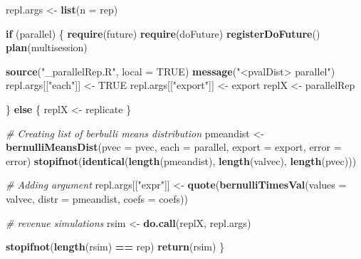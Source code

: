\documentclass[]{article}
\newenvironment{Shaded}{\begin{snugshade}}{\end{snugshade}}
\newcommand{\CommentTok}[1]{\textcolor[rgb]{0.56,0.35,0.01}{\textit{#1}}}
\newcommand{\ControlFlowTok}[1]{\textcolor[rgb]{0.13,0.29,0.53}{\textbf{#1}}}
\newcommand{\DataTypeTok}[1]{\textcolor[rgb]{0.13,0.29,0.53}{#1}}
\newcommand{\KeywordTok}[1]{\textcolor[rgb]{0.13,0.29,0.53}{\textbf{#1}}}
\newcommand{\NormalTok}[1]{#1}
\newcommand{\OperatorTok}[1]{\textcolor[rgb]{0.81,0.36,0.00}{\textbf{#1}}}
\newcommand{\OtherTok}[1]{\textcolor[rgb]{0.56,0.35,0.01}{#1}}
\newcommand{\StringTok}[1]{\textcolor[rgb]{0.31,0.60,0.02}{#1}}
\begin{document}
\begin{Shaded}
\begin{Highlighting}[]
\NormalTok{        repl.args <-}\StringTok{ }\KeywordTok{list}\NormalTok{(}\DataTypeTok{n =}\NormalTok{ rep)}
        
        \ControlFlowTok{if}\NormalTok{ (parallel) \{}
                \KeywordTok{require}\NormalTok{(future)}
                \KeywordTok{require}\NormalTok{(doFuture)}
                \KeywordTok{registerDoFuture}\NormalTok{()}
                \KeywordTok{plan}\NormalTok{(multisession)}
                
                \KeywordTok{source}\NormalTok{(}\StringTok{"_parallelRep.R"}\NormalTok{, }\DataTypeTok{local =} \OtherTok{TRUE}\NormalTok{)}
                \KeywordTok{message}\NormalTok{(}\StringTok{"<pvalDist> parallel"}\NormalTok{)}
\NormalTok{                repl.args[[}\StringTok{"each"}\NormalTok{]] <-}\StringTok{ }\OtherTok{TRUE}
\NormalTok{                repl.args[[}\StringTok{"export"}\NormalTok{]] <-}\StringTok{ }\NormalTok{export}
\NormalTok{                replX <-}\StringTok{ }\NormalTok{parallelRep}
                
\NormalTok{        \} }\ControlFlowTok{else}\NormalTok{ \{}
\NormalTok{                replX <-}\StringTok{ }\NormalTok{replicate}
\NormalTok{        \}}
        
        \CommentTok{# Creating list of berbulli means distribution}
\NormalTok{        pmeandist <-}\StringTok{ }\KeywordTok{bernulliMeansDist}\NormalTok{(}\DataTypeTok{pvec =}\NormalTok{ pvec, }\DataTypeTok{each =}\NormalTok{ parallel,}
                                       \DataTypeTok{export =}\NormalTok{ export, }\DataTypeTok{error =}\NormalTok{ error)}
        \KeywordTok{stopifnot}\NormalTok{(}\KeywordTok{identical}\NormalTok{(}\KeywordTok{length}\NormalTok{(pmeandist), }\KeywordTok{length}\NormalTok{(valvec), }\KeywordTok{length}\NormalTok{(pvec)))}
        
        \CommentTok{# Adding argument}
\NormalTok{        repl.args[[}\StringTok{"expr"}\NormalTok{]] <-}\StringTok{ }\KeywordTok{quote}\NormalTok{(}\KeywordTok{bernulliTimesVal}\NormalTok{(}\DataTypeTok{values =}\NormalTok{ valvec,}
                                                      \DataTypeTok{distr =}\NormalTok{ pmeandist,}
                                                      \DataTypeTok{coefs =}\NormalTok{ coefs))}
        
        \CommentTok{# revenue simulations}
\NormalTok{        rsim <-}\StringTok{ }\KeywordTok{do.call}\NormalTok{(replX, repl.args)}
        
        \KeywordTok{stopifnot}\NormalTok{(}\KeywordTok{length}\NormalTok{(rsim) }\OperatorTok{==}\StringTok{ }\NormalTok{rep)}
        \KeywordTok{return}\NormalTok{(rsim)}
\NormalTok{\}}
\end{Highlighting}
\end{Shaded}
\end{document}
